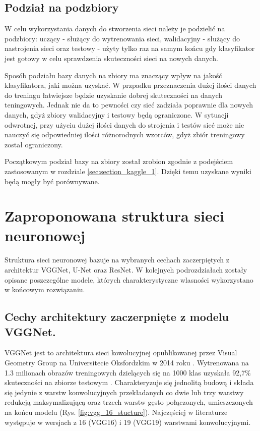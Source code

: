 \subsection{Podział na podzbiory}

W celu wykorzystania danych do stworzenia sieci należy je podzielić na podzbiory: uczący - służący do wytrenowania sieci, walidacyjny - służący do nastrojenia sieci oraz testowy - użyty tylko raz na samym końcu gdy klasyfikator jest gotowy w celu sprawdzenia skuteczności sieci na nowych danych.

{\parindent0pt
Sposób podziału bazy danych na zbiory ma znaczący wpływ na jakość klasyfikatora, jaki można uzyskać. W przpadku przeznaczenia dużej ilości danych do treningu łatwiejsze będzie uzyskanie dobrej skuteczności na danych teningowych. Jednak nie da to pewności czy sieć zadziała poprawnie dla nowych danych, gdyż zbiory walidacyjny i testowy będą ograniczone. W sytuacji odwrotnej, przy użyciu dużej ilości danych do strojenia i testów sieć może nie nauczyć się odpowiedniej ilości różnorodnych wzorców, gdyż zbiór treningowy został ograniczony.

Początkowym podział bazy na zbiory został zrobion zgodnie z podejściem zastosowanym w rozdziale \ref{sec:section_kaggle_1}. Dzięki temu uzyskane wyniki będą mogły być porównywane.
}

\section{Zaproponowana struktura sieci neuronowej}
Struktura sieci neuronowej bazuje na wybranych cechach zaczerpiętych z architektur VGGNet, U-Net oraz ResNet. W kolejnych podrozdziałach zostały opisane poszczególne modele, których charakterystyczne wlasności wykorzystano w końcowym rozwiązaniu.

\subsection{Cechy architektury zaczerpnięte z modelu VGGNet.}

VGGNet jest to architektura sieci kowolucyjnej opublikowanej przez Visual Geometry Group na Universitecie Oksfordzkim w 2014 roku \cite{VGG16_info}. Wytrenowana na 1.3 milionach obrazów treningowych dzielących się na 1000 klas uzyskała 92,7\% skuteczności na zbiorze testowym \cite{deep_learning_w_keras} \cite{VGG16_article_online}. Charakteryzuje się jednolitą budową i składa się jedynie z warstw konwolucyjnych przekładanych co dwie lub trzy warstwy redukcją maksymalizującą oraz trzech warstw gęsto połączonych, umieszczonych na końcu modelu (Rys. \ref{fig:vgg_16_stucture}). Najczęściej w literaturze występuje w wersjach z 16 (VGG16) i 19 (VGG19) warstwami konwolucyjnymi. 

